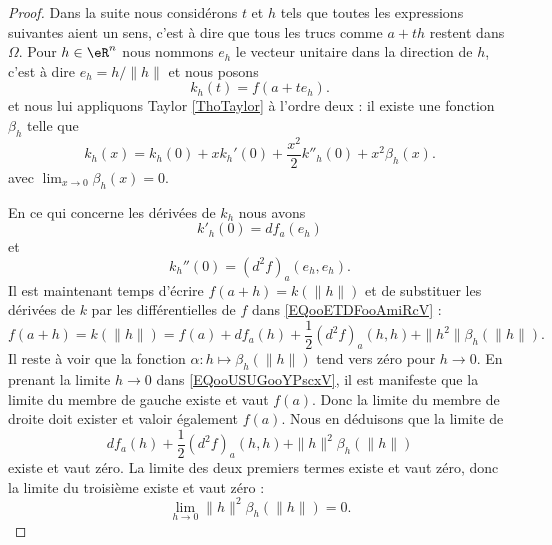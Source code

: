 \begin{proof}
    Dans la suite nous considérons \( t\) et \( h\) tels que toutes les expressions suivantes aient un sens, c'est à dire que tous les trucs comme \( a+th\) restent dans \( \Omega\). Pour \( h\in \eR^n\) nous nommons \( e_h\) le vecteur unitaire dans la direction de \( h\), c'est à dire \( e_h=h/\| h \|\) et nous posons
    \begin{equation}
        k_h(t)=f(a+te_h).
    \end{equation}
    et nous lui appliquons Taylor \ref{ThoTaylor} à l'ordre deux : il existe une fonction \( \beta_h\) telle que
    \begin{equation}        \label{EQooETDFooAmiRcV}
        k_h(x)=k_h(0)+xk_h'(0)+\frac{ x^2 }{2}k''_h(0)+x^2\beta_h(x).
    \end{equation}
    avec \( \lim_{x\to 0} \beta_h(x)=0\).

    En ce qui concerne les dérivées de \( k_h\) nous avons 
    \begin{equation}
        k'_h(0)=df_a(e_h)
    \end{equation}
    et
    \begin{equation}
        k_h''(0)=(d^2f)_{a}(e_h,e_h).
    \end{equation}
    Il est maintenant temps d'écrire \( f(a+h)=k(\| h \|)\) et de substituer les dérivées de \( k\) par les différentielles de \( f\) dans \eqref{EQooETDFooAmiRcV} :
    \begin{equation}        \label{EQooUSUGooYPscxV}
            f(a+h)=k(\| h \|)=f(a)+df_a(h)+\frac{ 1 }{2}(d^2f)_a(h,h)+\| h^2 \|\beta_{h}(\| h \|).
    \end{equation}
    Il reste à voir que la fonction \( \alpha\colon h\mapsto \beta_h(\| h \|)\) tend vers zéro pour \( h\to 0\). En prenant la limite \( h\to 0\) dans \eqref{EQooUSUGooYPscxV}, il est manifeste que la limite du membre de gauche existe et vaut \( f(a)\). Donc la limite du membre de droite doit exister et valoir également \( f(a)\). Nous en déduisons que la limite de
    \begin{equation}
        df_a(h)+\frac{ 1 }{2}(d^2f)_a(h,h)+\| h \|^2\beta_h(\| h \|)
    \end{equation}
    existe et vaut zéro. La limite des deux premiers termes existe et vaut zéro, donc la limite du troisième existe et vaut zéro :
    \begin{equation}
        \lim_{h\to 0} \| h \|^2\beta_h(\| h \|)=0.
    \end{equation}
\end{proof}

